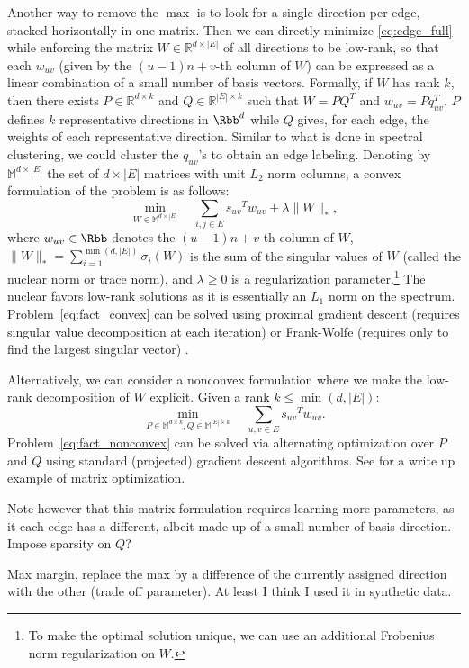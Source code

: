 Another way to remove the $\max$ is to look for a single direction per edge, stacked horizontally in
one matrix. Then we can directly minimize \eqref{eq:edge_full} while enforcing the matrix
$W\in\mathbb{R}^{d\times |E|}$ of all directions to be low-rank, so that each $w_{uv}$ (given by the
$(u-1)n+v$-th column of $W$) can be expressed as a linear combination of a small number of basis
vectors. Formally, if $W$ has rank $k$, then there exists $P\in\mathbb{R}^{d\times k}$ and
$Q\in\mathbb{R}^{|E|\times k}$ such that $W=PQ^T$ and $w_{uv} = Pq_{uv}^T$. $P$ defines $k$
representative directions in $\Rbb^d$ while $Q$ gives, for each edge, the weights of each
representative direction. Similar to what is done in spectral clustering, we could cluster the
$q_{uv}$'s to obtain an edge labeling.
%
Denoting by $\mathbb{M}^{d\times |E|}$ the set of $d\times |E|$ matrices with unit $L_2$ norm
columns, a convex formulation of the problem is as follows:
\begin{equation}
  \label{eq:fact_convex}
  \min_{W\in\mathbb{M}^{d\times |E|}} \quad
  \sum_{i,j \in E} {s_{uv}}^T w_{uv} + \lambda \|W\|_*,
\end{equation}
where $w_{uv} \in \Rbb$ denotes the $(u-1)n+v$-th column of $W$, $\|W\|_* =
\sum_{i=1}^{\min(d,|E|)}\sigma_i(W)$ is the sum of the singular values of $W$ (called the nuclear
norm or trace norm), and $\lambda \geq 0$ is a regularization parameter.\footnote{To make the
optimal solution unique, we can use an additional Frobenius norm regularization on $W$.} The nuclear
favors low-rank solutions as it is essentially an $L_1$ norm on the spectrum.
Problem~\eqref{eq:fact_convex} can be solved using proximal gradient descent (requires singular
value decomposition at each iteration) \autocite{Parikh2013a} or Frank-Wolfe (requires only to find
the largest singular vector) \autocite{Jaggi2013a}.

Alternatively, we can consider a nonconvex formulation where we make the low-rank decomposition of
$W$ explicit. Given a rank $k\leq \min(d,|E|)$:
\begin{equation}
  \label{eq:fact_nonconvex}
  \min_{P\in\mathbb{M}^{d\times k}, Q\in\mathbb{M}^{|E|\times k}} \quad
  \sum_{u,v \in E} {s_{uv}}^T w_{uv}.
\end{equation}
Problem~\eqref{eq:fact_nonconvex} can be solved via alternating optimization over $P$ and $Q$ using
standard (projected) gradient descent algorithms.
See \autocite[Section 6]{attributedSNE17} for a write up example of matrix optimization.

Note however that this matrix formulation requires learning more parameters, as it each edge has a
different, albeit made up of a small number of basis direction.  Impose sparsity on $Q$?

Max margin, replace the max by a difference of the currently assigned direction with the other
(trade off parameter). At least I think I used it in synthetic data.

